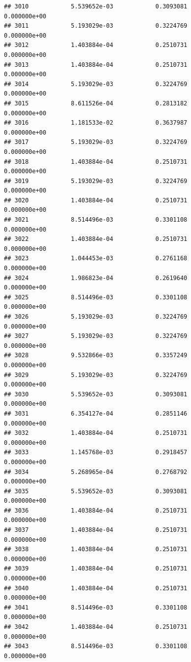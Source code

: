 \documentclass[
]{article}
\begin{document}
\begin{verbatim}
## 3010            5.539652e-03            0.3093081            0.000000e+00
## 3011            5.193029e-03            0.3224769            0.000000e+00
## 3012            1.403884e-04            0.2510731            0.000000e+00
## 3013            1.403884e-04            0.2510731            0.000000e+00
## 3014            5.193029e-03            0.3224769            0.000000e+00
## 3015            8.611526e-04            0.2813182            0.000000e+00
## 3016            1.181533e-02            0.3637987            0.000000e+00
## 3017            5.193029e-03            0.3224769            0.000000e+00
## 3018            1.403884e-04            0.2510731            0.000000e+00
## 3019            5.193029e-03            0.3224769            0.000000e+00
## 3020            1.403884e-04            0.2510731            0.000000e+00
## 3021            8.514496e-03            0.3301108            0.000000e+00
## 3022            1.403884e-04            0.2510731            0.000000e+00
## 3023            1.044453e-03            0.2761168            0.000000e+00
## 3024            1.986823e-04            0.2619640            0.000000e+00
## 3025            8.514496e-03            0.3301108            0.000000e+00
## 3026            5.193029e-03            0.3224769            0.000000e+00
## 3027            5.193029e-03            0.3224769            0.000000e+00
## 3028            9.532866e-03            0.3357249            0.000000e+00
## 3029            5.193029e-03            0.3224769            0.000000e+00
## 3030            5.539652e-03            0.3093081            0.000000e+00
## 3031            6.354127e-04            0.2851146            0.000000e+00
## 3032            1.403884e-04            0.2510731            0.000000e+00
## 3033            1.145768e-03            0.2918457            0.000000e+00
## 3034            5.268965e-04            0.2768792            0.000000e+00
## 3035            5.539652e-03            0.3093081            0.000000e+00
## 3036            1.403884e-04            0.2510731            0.000000e+00
## 3037            1.403884e-04            0.2510731            0.000000e+00
## 3038            1.403884e-04            0.2510731            0.000000e+00
## 3039            1.403884e-04            0.2510731            0.000000e+00
## 3040            1.403884e-04            0.2510731            0.000000e+00
## 3041            8.514496e-03            0.3301108            0.000000e+00
## 3042            1.403884e-04            0.2510731            0.000000e+00
## 3043            8.514496e-03            0.3301108            0.000000e+00

\end{verbatim}
\end{document}
